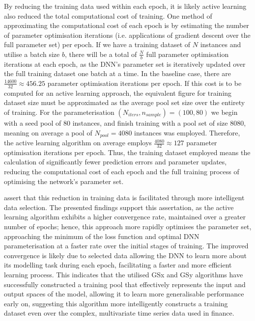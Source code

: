 \documentclass[a4paper, 11pt]{report}
\begin{document}
    By reducing the training data used within each epoch, it is likely active learning also reduced the total computational cost of training. One method of approximating the computational cost of each epoch is by estimating the number of parameter optimisation iterations (i.e. applications of gradient descent over the full parameter set) per epoch. If we have a training dataset of $N$ instances and utilise a batch size $b$, there will be a total of $\frac{N}{b}$ full parameter optimisation iterations at each epoch, as the DNN's parameter set is iteratively updated over the full training dataset one batch at a time. In the baseline case, there are $\frac{14600}{32} \approx 456.25$ parameter optimisation iterations per epoch. If this cost is to be computed for an active learning approach, the equivalent figure for training dataset size must be approximated as the average pool set size over the entirety of training. For the parameterisation $(N_{iters}, n_{sample}) = (100, 80)$ we begin with a seed pool of $80$ instances, and finish training with a pool set of size $8080$, meaning on average a pool of $N_{pool} = 4080$ instances was employed. Therefore, the active learning algorithm on average employs $\frac{4080}{32} \approx 127$ parameter optimisation iterations per epoch. Thus, the training dataset employed means the calculation of significantly fewer prediction errors and parameter updates, reducing the computational cost of each epoch and the full training process of optimising the network's parameter set.

    \citet{ren-2021} assert that this reduction in training data is facilitated through more intelligent data selection. The presented findings support this assertation, as the active learning algorithm exhibits a higher convergence rate, maintained over a greater number of epochs; hence, this approach more rapidly optimises the parameter set, approaching the minimum of the loss function and optimal DNN parameterisation at a faster rate over the initial stages of training. The improved convergence is likely due to selected data allowing the DNN to learn more about its modelling task during each epoch, facilitating a faster and more efficient learning process. This indicates that the utilised GSx and GSy algorithms have successfully constructed a training pool that effectively represents the input and output spaces of the model, allowing it to learn more generalisable performance early on, suggesting this algorithm more intelligently constructs a training dataset even over the complex, multivariate time series data used in finance.
\end{document}
